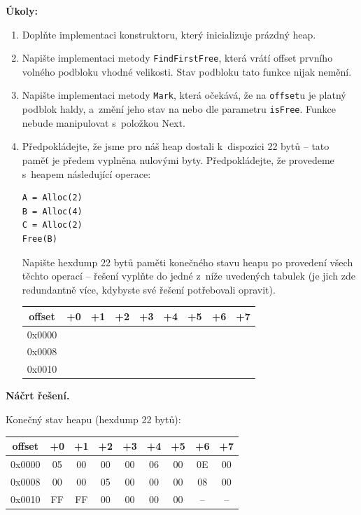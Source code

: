 \medskip
\noindent\textbf{Úkoly:}
\begin{enumerate}
\item Doplňte implementaci konstruktoru, který inicializuje prázdný heap.
\item Napište implementaci metody \texttt{FindFirstFree}, která vrátí offset prvního
  volného podbloku vhodné velikosti. Stav podbloku tato funkce nijak nemění.
\item Napište implementaci metody \texttt{Mark}, která očekává, že na \texttt{offset}u je
  platný podblok haldy, a~změní jeho stav na  nebo  dle parametru
  \texttt{isFree}. Funkce nebude manipulovat s~položkou Next.
\item Předpokládejte, že jsme pro náš heap dostali k~dispozici 22 bytů -- tato paměť je
  předem vyplněna nulovými byty. Předpokládejte, že provedeme s~heapem následující operace:

\begin{lstlisting}[language={[Sharp]C}]
A = Alloc(2)
B = Alloc(4)
C = Alloc(2)
Free(B)
\end{lstlisting}

Napište hexdump 22 bytů paměti konečného stavu heapu po provedení všech těchto operací --
řešení vyplňte do jedné z~níže uvedených tabulek (je jich zde redundantně více, kdybyste
své řešení potřebovali opravit).

\begin{center}
\begin{tabular}{|c|c|c|c|c|c|c|c|c|}
\hline
\textbf{offset} & +0 & +1 & +2 & +3 & +4 & +5 & +6 & +7 \\
\hline
0x0000 & & & & & & & & \\
\hline
0x0008 & & & & & & & & \\
\hline
0x0010 & & & & & & & & \\
\hline
\end{tabular}
\end{center}
\end{enumerate}

\medskip
\noindent\textbf{Náčrt řešení.}\par
Konečný stav heapu (hexdump 22 bytů):
\begin{center}
\begin{tabular}{|c|c|c|c|c|c|c|c|c|}
\hline
\textbf{offset} & +0 & +1 & +2 & +3 & +4 & +5 & +6 & +7 \\
\hline
0x0000 & 05 & 00 & 00 & 00 & 06 & 00 & 0E & 00 \\
\hline
0x0008 & 00 & 00 & 05 & 00 & 00 & 00 & 08 & 00 \\
\hline
0x0010 & FF & FF & 00 & 00 & 00 & 00 & -- & -- \\
\hline
\end{tabular}
\end{center}


